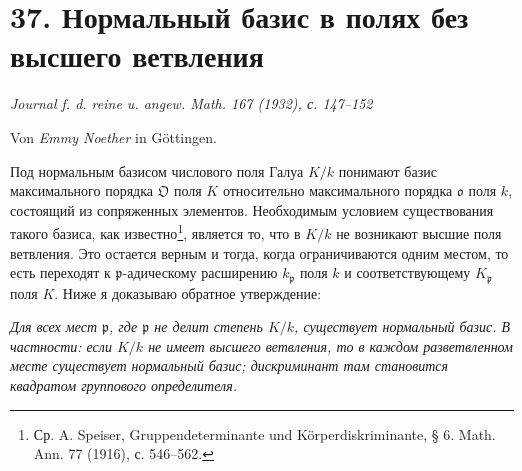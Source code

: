 \documentclass[11pt]{article}
\providecommand{\frakO}{\mathfrak{O}}
\providecommand{\frako}{\mathfrak{o}}
\providecommand{\frakp}{\mathfrak{p}}
\begin{document}
\section*{37. Нормальный базис в полях без высшего ветвления}

\begin{center}
\emph{Journal f. d. reine u. angew. Math. 167 (1932), с. 147--152}
\end{center}

\begin{center}
Von \emph{Emmy Noether} in Göttingen.
\end{center}

Под нормальным базисом числового поля Галуа \(K/k\) понимают базис максимального порядка \(\frakO\) поля \(K\) относительно максимального порядка \(\frako\) поля \(k\), состоящий из сопряженных элементов. Необходимым условием существования такого базиса, как известно\footnote{Ср. A. Speiser, Gruppendeterminante und Körperdiskriminante, § 6. Math. Ann. 77 (1916), с. 546--562.}, является то, что в \(K/k\) не возникают высшие поля ветвления. Это остается верным и тогда, когда ограничиваются одним местом, то есть переходят к \(\frakp\)-адическому расширению \(k_\frakp\) поля \(k\) и соответствующему \(K_\frakp\) поля \(K\). Ниже я доказываю обратное утверждение:

\emph{Для всех мест \(\frakp\), где \(\frakp\) не делит степень \(K/k\), существует нормальный базис. В частности: если \(K/k\) не имеет высшего ветвления, то в каждом разветвленном месте существует нормальный базис; дискриминант там становится квадратом группового определителя.}
\end{document}
